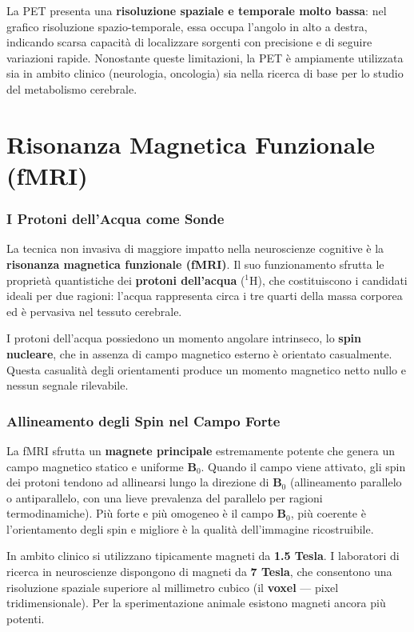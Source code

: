 La PET presenta una \textbf{risoluzione spaziale e temporale molto bassa}: nel grafico risoluzione spazio-temporale, essa occupa l'angolo in alto a destra, indicando scarsa capacità di localizzare sorgenti con precisione e di seguire variazioni rapide. Nonostante queste limitazioni, la PET è ampiamente utilizzata sia in ambito clinico (neurologia, oncologia) sia nella ricerca di base per lo studio del metabolismo cerebrale.



\section{Risonanza Magnetica Funzionale (fMRI)}

\subsubsection{I Protoni dell'Acqua come Sonde}

La tecnica non invasiva di maggiore impatto nella neuroscienze cognitive è la \textbf{risonanza magnetica funzionale (fMRI)}. Il suo funzionamento sfrutta le proprietà quantistiche dei \textbf{protoni dell'acqua} ($^{1}\mathrm{H}$), che costituiscono i candidati ideali per due ragioni: l'acqua rappresenta circa i tre quarti della massa corporea ed è pervasiva nel tessuto cerebrale.

I protoni dell'acqua possiedono un momento angolare intrinseco, lo \textbf{spin nucleare}, che in assenza di campo magnetico esterno è orientato casualmente. Questa casualità degli orientamenti produce un momento magnetico netto nullo e nessun segnale rilevabile.

\subsubsection{Allineamento degli Spin nel Campo Forte}

La fMRI sfrutta un \textbf{magnete principale} estremamente potente che genera un campo magnetico statico e uniforme $\mathbf{B}_0$. Quando il campo viene attivato, gli spin dei protoni tendono ad allinearsi lungo la direzione di $\mathbf{B}_0$ (allineamento parallelo o antiparallelo, con una lieve prevalenza del parallelo per ragioni termodinamiche). Più forte e più omogeneo è il campo $\mathbf{B}_0$, più coerente è l'orientamento degli spin e migliore è la qualità dell'immagine ricostruibile.

In ambito clinico si utilizzano tipicamente magneti da \textbf{1.5 Tesla}. I laboratori di ricerca in neuroscienze dispongono di magneti da \textbf{7 Tesla}, che consentono una risoluzione spaziale superiore al millimetro cubico (il \textbf{voxel} — pixel tridimensionale). Per la sperimentazione animale esistono magneti ancora più potenti.


